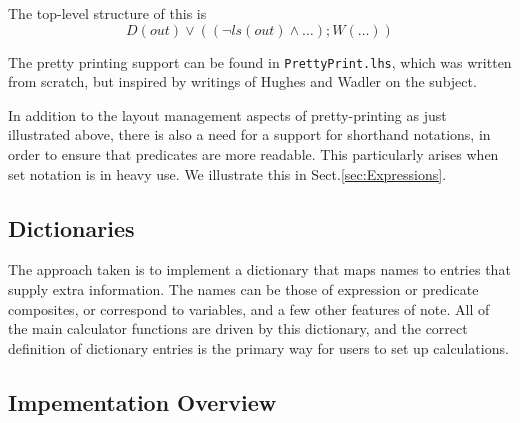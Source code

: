 \noindent
The top-level structure of this is
\[D(out) \lor ( (\lnot ls(out) \land \dots) ; W(\dots) )\]

\noindent
The pretty printing support can be found in \texttt{PrettyPrint.lhs},
which was written from scratch, but inspired by writings of
Hughes\cite{HughesJohn1995c} and Wadler\cite{wadler-pp}
on the subject.

In addition to the layout management aspects of pretty-printing
as just illustrated above,
there is also a need for a support for shorthand notations,
in order to ensure that predicates are more readable.
This particularly arises when set notation is in heavy use.
We illustrate this in Sect.\ref{sec:Expressions}.

\subsection{Dictionaries}\label{ssec:dict}

The approach taken is to implement a dictionary that maps names
to entries that supply extra information.
The names can be those of expression or predicate composites,
or correspond to variables, and a few other features of note.
All of the main calculator functions are driven by this
dictionary,
and the correct definition of dictionary entries
is the primary way for users to set up calculations.

%





\subsection{Impementation Overview}

